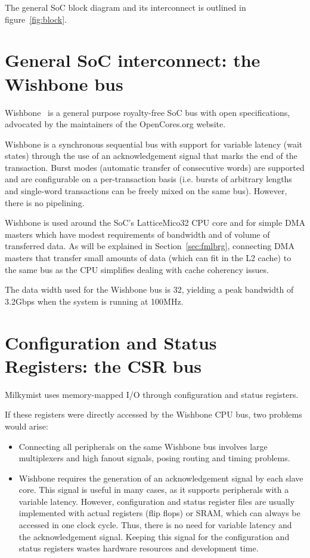 \documentclass[a4paper,11pt]{kthesis}
\begin{document}
The general SoC block diagram and its interconnect is outlined in figure~\ref{fig:block}.

\section{General SoC interconnect: the Wishbone bus}
Wishbone~\cite{wishbone} is a general purpose royalty-free SoC bus with open specifications, advocated by the maintainers of the OpenCores.org website.

Wishbone is a synchronous sequential bus with support for variable latency (wait states) through the use of an acknowledgement signal that marks the end of the transaction. Burst modes (automatic transfer of consecutive words) are supported and are configurable on a per-transaction basis (i.e. bursts of arbitrary lengths and single-word transactions can be freely mixed on the same bus). However, there is no pipelining.

Wishbone is used around the SoC's LatticeMico32 CPU core and for simple DMA masters which have modest requirements of bandwidth and of volume of transferred data. As will be explained in Section~\ref{sec:fmlbrg}, connecting DMA masters that transfer small amounts of data (which can fit in the L2 cache) to the same bus as the CPU simplifies dealing with cache coherency issues.

The data width used for the Wishbone bus is 32, yielding a peak bandwidth of 3.2Gbps when the system is running at 100MHz.

\section{Configuration and Status Registers: the CSR bus}
Milkymist uses memory-mapped I/O through configuration and status registers.

If these registers were directly accessed by the Wishbone CPU bus, two problems would arise:
\begin{itemize}
\item Connecting all peripherals on the same Wishbone bus involves large multiplexers and high fanout signals, posing routing and timing problems.
\item Wishbone requires the generation of an acknowledgement signal by each slave core. This signal is useful in many cases, as it supports peripherals with a variable latency. However, configuration and status register files are usually implemented with actual registers (flip flops) or SRAM, which can always be accessed in one clock cycle. Thus, there is no need for variable latency and the acknowledgement signal. Keeping this signal for the configuration and status registers wastes hardware resources and development time.
\end{itemize}
\end{document}

